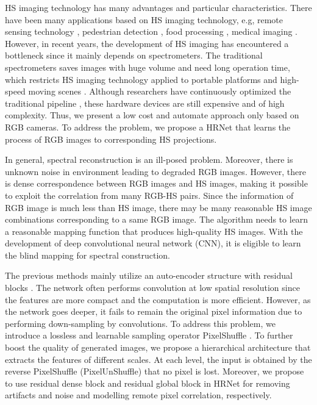 \documentclass[10pt,twocolumn,letterpaper]{article}
\begin{document}
HS imaging technology has many advantages and particular characteristics. There have been many applications based on HS imaging technology, e.g, remote sensing technology \cite{melgani2004classification}, pedestrian detection \cite{hwang2015multispectral, liu2016multispectral}, food processing \cite{qin2013hyperspectral}, medical imaging \cite{andersson1987multispectral}. However, in recent years, the development of HS imaging has encountered a bottleneck since it mainly depends on spectrometers. The traditional spectrometers saves images with huge volume and need long operation time, which restricts HS imaging technology applied to portable platforms and high-speed moving scenes \cite{poli2012review}. Although researchers have continuously optimized the traditional pipeline \cite{cao2011prism, wang2016adaptive}, these hardware devices are still expensive and of high complexity. Thus, we present a low cost and automate approach only based on RGB cameras. To address the problem, we propose a HRNet that learns the process of RGB images to corresponding HS projections.



In general, spectral reconstruction is an ill-posed problem. Moreover, there is unknown noise in environment leading to degraded RGB images. However, there is dense correspondence between RGB images and HS images, making it possible to exploit the correlation from many RGB-HS pairs. Since the information of RGB image is much less than HS image, there may be many reasonable HS image combinations corresponding to a same RGB image. The algorithm needs to learn a reasonable mapping function that produces high-quality HS images. With the development of deep convolutional neural network (CNN), it is eligible to learn the blind mapping for spectral construction.

The previous methods \cite{shi2018hscnn+, koundinya20182d, stiebel2018reconstructing, can2018efficient, xiong2017hscnn} mainly utilize an auto-encoder structure with residual blocks \cite{he2016deep}. The network often performs convolution at low spatial resolution since the features are more compact and the computation is more efficient. However, as the network goes deeper, it fails to remain the original pixel information due to performing down-sampling by convolutions. To address this problem, we introduce a lossless and learnable sampling operator PixelShuffle \cite{shi2016real}. To further boost the quality of generated images, we propose a hierarchical architecture that extracts the features of different scales. At each level, the input is obtained by the reverse PixelShuffle (PixelUnShuffle) that no pixel is lost. Moreover, we propose to use residual dense block and residual global block in HRNet for removing artifacts and noise and modelling remote pixel correlation, respectively.
\end{document}

